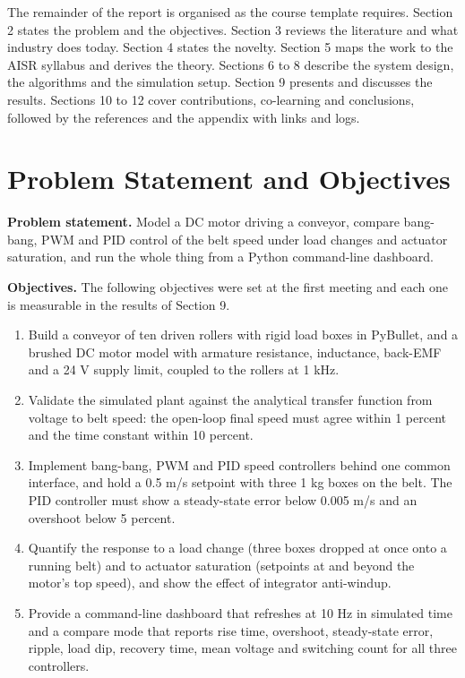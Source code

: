 \documentclass[12pt,a4paper]{article}
\begin{document}
The remainder of the report is organised as the course template requires. Section 2 states the problem and the objectives. Section 3 reviews the literature and what industry does today. Section 4 states the novelty. Section 5 maps the work to the AISR syllabus and derives the theory. Sections 6 to 8 describe the system design, the algorithms and the simulation setup. Section 9 presents and discusses the results. Sections 10 to 12 cover contributions, co-learning and conclusions, followed by the references and the appendix with links and logs.

\section{Problem Statement and Objectives}

\textbf{Problem statement.} Model a DC motor driving a conveyor, compare bang-bang, PWM and PID control of the belt speed under load changes and actuator saturation, and run the whole thing from a Python command-line dashboard.

\textbf{Objectives.} The following objectives were set at the first meeting and each one is measurable in the results of Section 9.
\begin{enumerate}[nosep]
  \item Build a conveyor of ten driven rollers with rigid load boxes in PyBullet, and a brushed DC motor model with armature resistance, inductance, back-EMF and a 24 V supply limit, coupled to the rollers at 1 kHz.
  \item Validate the simulated plant against the analytical transfer function from voltage to belt speed: the open-loop final speed must agree within 1 percent and the time constant within 10 percent.
  \item Implement bang-bang, PWM and PID speed controllers behind one common interface, and hold a 0.5 m/s setpoint with three 1 kg boxes on the belt. The PID controller must show a steady-state error below 0.005 m/s and an overshoot below 5 percent.
  \item Quantify the response to a load change (three boxes dropped at once onto a running belt) and to actuator saturation (setpoints at and beyond the motor's top speed), and show the effect of integrator anti-windup.
  \item Provide a command-line dashboard that refreshes at 10 Hz in simulated time and a compare mode that reports rise time, overshoot, steady-state error, ripple, load dip, recovery time, mean voltage and switching count for all three controllers.
\end{enumerate}
\end{document}
